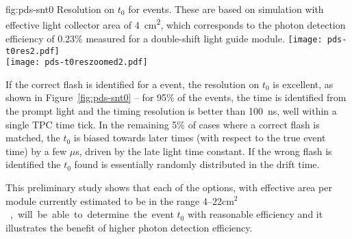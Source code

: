 \begin{dunefigure}{fig:pds-snt0}
{Resolution on $t_0$ for  events. These are based on simulation with effective light collector area of \SI{4}{cm^2}, which corresponds to the photon detection efficiency of 0.23\% measured for a double-shift light guide module.}
  \texttt{[image: pds-t0res2.pdf]}\\
  \texttt{[image: pds-t0reszoomed2.pdf]}
\end{dunefigure}

If the correct flash is identified for a  event, the resolution on $t_0$ is excellent, as shown in Figure~\ref{fig:pds-snt0} -- for 95\% of the events, the time is identified from the prompt light and the timing resolution is better than \SI{100}{ns}, well within a single TPC time tick. In the remaining 5\% of cases where a correct flash is matched, the $t_0$ is biased towards later times (with respect to the true event time) by a few $\mu$s, driven by the late light time constant. If the wrong flash is identified the $t_0$ found is essentially randomly distributed in the drift time.

This preliminary study shows that each of the  options, with effective area per module currently estimated to be in the range  \numrange{4}{22}\si{cm$^2$}, will be able to determine the event $t_0$ with reasonable efficiency and it illustrates the benefit of higher photon detection efficiency. 



